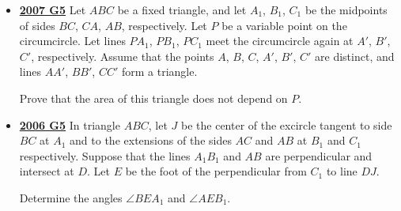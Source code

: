 \documentclass[11pt]{scrartcl}
\begin{document}
\begin{itemize}[leftmargin=*]
Prove that $ I$ contains at least $ \dfrac{1}{2}(k + 1)(k + 2)$ red points.
\item \href{https://artofproblemsolving.com/community/c6h214646p1186790}{\textbf{2007 G5}} Let $ ABC$ be a fixed triangle, and let $ A_1$, $ B_1$, $ C_1$ be the midpoints of sides $ BC$, $ CA$, $ AB$, respectively. Let $ P$ be a variable point on the circumcircle. Let lines $ PA_1$, $ PB_1$, $ PC_1$ meet the circumcircle again at $ A'$, $ B'$, $ C'$, respectively. Assume that the points $ A$, $ B$, $ C$, $ A'$, $ B'$, $ C'$ are distinct, and lines $ AA'$, $ BB'$, $ CC'$ form a triangle.

Prove that the area of this triangle does not depend on $ P$.
\item \href{https://artofproblemsolving.com/community/c6h155708p875023}{\textbf{2006 G5}} 	In triangle $ABC$, let $J$ be the center of the excircle tangent to side $BC$ at $A_{1}$ and to the extensions of the sides $AC$ and $AB$ at $B_{1}$ and $C_{1}$ respectively. Suppose that the lines $A_{1}B_{1}$ and $AB$ are perpendicular and intersect at $D$. Let $E$ be the foot of the perpendicular from $C_{1}$ to line $DJ$. 

Determine the angles $\angle{BEA_{1}}$ and $\angle{AEB_{1}}$.
\end{itemize}
\newpage
\end{document}
